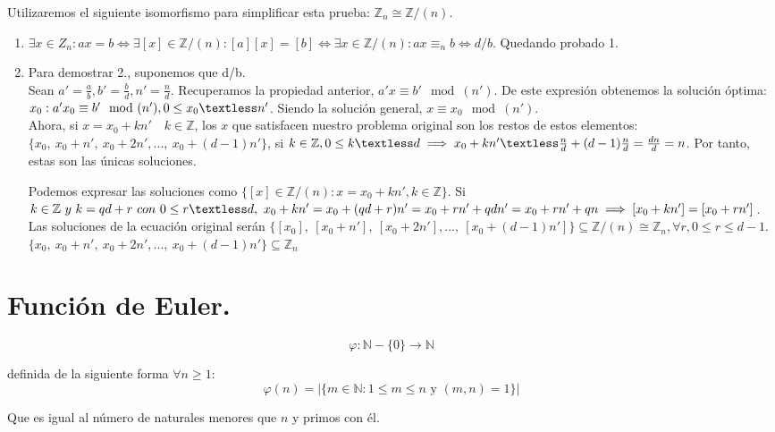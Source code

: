 \documentclass[11pt, a4paper, titlepage]{article}
\makeatletter
\renewenvironment{proof}[1][\proofname] {\vspace{-15pt}\par\pushQED{\qed}\normalfont\topsep6\p@\@plus6\p@\relax\trivlist\item[\hskip\labelsep\it#1\@addpunct{.}]\ignorespaces}{\popQED\endtrivlist\@endpefalse}
\providecommand{\ent}{\mathbb{Z}}
\theoremstyle{theorem-style}
\theoremstyle{definition-style}
\theoremstyle{remark-style}
\theoremstyle{example-style}
\makeatother
\begin{document}
\begin{proof}
Utilizaremos el siguiente isomorfismo para simplificar esta prueba: $\ent_n \cong \ent/(n)$.\\
\begin{enumerate}
	\item $\exists x \in Z_n :  ax = b \iff \exists[x] \in \ent/(n) : [a][x] = [b] \iff \exists x \in \ent /(n) : ax \equiv_n b \iff d/b$. Quedando probado 1.
	\item  Para demostrar 2., suponemos que d/b.\\
	 Sean $a' = \frac{a}{b}, b' = \frac{b}{d}, n' = \frac{n}{d}$. Recuperamos la propiedad anterior, $a'x \equiv b'\mod(n')$. De este expresión obtenemos la solución óptima: $x_0 : a'x_0 \equiv b'\mod(n'), 0 \le x_0 \textless n'$. Siendo la solución general, $x \equiv x_0 \mod(n')$.\\
Ahora, si $x = x_0 + kn' \quad k \in \ent$, los $x$ que satisfacen nuestro problema original son los restos de estos elementos:\quad $\{x_0,\ x_0 + n',\ x_0 +2n',...,\ x_0 + (d-1)n'\}$, si $k \in \ent, 0 \le k \textless d \implies x_0 + kn' \textless \frac{n}{d} + (d-1)\frac{n}{d} = \frac{dn}{d} = n$. Por tanto, estas son las únicas soluciones.

Podemos expresar las soluciones como $\{ [x] \in \ent /(n) : x = x_0 + kn', k \in \ent\}$. Si $k \in \ent \ y \ k = qd + r \ con \ 0 \le r \textless d, \ x_0 + kn' = x_0 + (qd + r)n' = x_0 + rn' + qdn'= x_0 + rn' +qn \implies [x_0 + kn'] = [x_0 + rn']$. Las soluciones de la ecuación original serán $\{[x_0],\ [x_0 + n'],\ [x_0 +2n'],...,\ [x_0 + (d-1)n']\} \subseteq \ent /(n) \cong \ent _n, \forall r, 0 \le r \le d - 1.$
$\{x_0,\ x_0 + n',\ x_0 +2n',...,\ x_0 + (d-1)n'\} \subseteq \ent _n$
\end{enumerate}
	
	
	
\end{proof}

\section{Función de Euler.}
\[
  \varphi : \mathbb{N}-\{0\} \longrightarrow \mathbb{N}  
\]

definida de la siguiente forma $\forall n\ge 1$:
\[
  \varphi(n) = |\{m\in \mathbb{N} : 1\le m \le n \text{ y } (m,n)=1\}|
\]

Que es igual al número de naturales menores que $n$ y primos con él.
\end{document}
